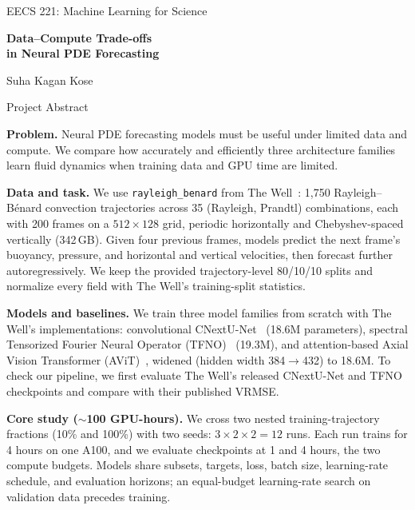\documentclass[11pt]{article}
\newcommand{\topic}[1]{\textbf{#1}\enspace}
\begin{document}
\begin{center}
    {\large EECS 221: Machine Learning for Science\par}
    \vspace{5pt}
    {\LARGE\bfseries
    Data--Compute Trade-offs\\[3pt]
    in Neural PDE Forecasting\par}
    \vspace{7pt}
    {\Large Suha Kagan Kose\par}
    \vspace{6pt}
    {\large Project Abstract\par}
\end{center}

\topic{Problem.}
Neural PDE forecasting models must be useful under limited data and
compute. We compare how accurately and efficiently three architecture
families learn fluid dynamics when training data and GPU time are limited.

\topic{Data and task.}
We use \texttt{rayleigh\_benard} from The Well~\cite{ohana2024well}: 1,750 Rayleigh--B\'enard convection trajectories across 35 (Rayleigh, Prandtl) combinations, each with 200 frames on a $512\times128$ grid, periodic horizontally and Chebyshev-spaced vertically (342\,GB). Given four previous frames, models predict the next frame's buoyancy, pressure, and horizontal and vertical velocities, then forecast further autoregressively. We keep the provided trajectory-level 80/10/10 splits and normalize every field with The Well's training-split statistics.

\topic{Models and baselines.}
We train three model families from scratch with The Well's implementations: convolutional CNextU-Net~\cite{liu2022convnext} (18.6M parameters), spectral Tensorized Fourier Neural Operator (TFNO)~\cite{kossaifi2024tfno} (19.3M), and attention-based Axial Vision Transformer (AViT)~\cite{mccabe2024mpp}, widened (hidden width 384$\rightarrow$432) to 18.6M. To check our pipeline, we first evaluate The Well's released CNextU-Net and TFNO checkpoints and compare with their published VRMSE.

\topic{Core study (${\sim}$100 GPU-hours).}
We cross two nested training-trajectory fractions (10\% and 100\%) with two seeds: $3\times2\times2=12$ runs. Each run trains for 4 hours on one A100, and we evaluate checkpoints at 1 and 4 hours, the two compute budgets. Models share subsets, targets, loss, batch size, learning-rate schedule, and evaluation horizons; an equal-budget learning-rate search on validation data precedes training.
\end{document}
